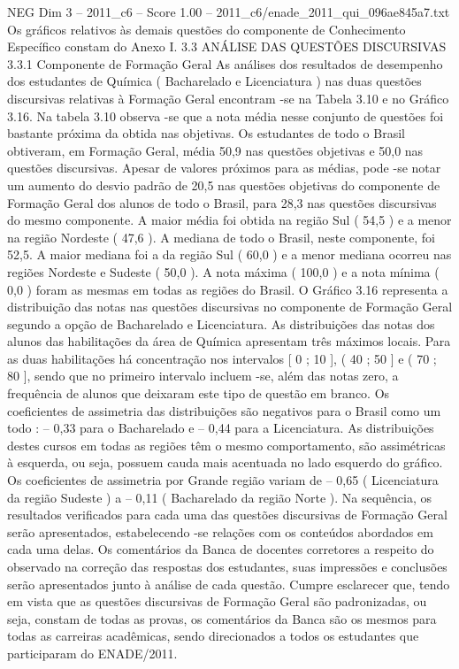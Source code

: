 \begin{textsample}{NEG Dim 3 – 2011\_c6 – Score 1.00 – 2011\_c6/enade\_2011\_qui\_096ae845a7.txt}
Os gráficos relativos às demais questões do componente de Conhecimento Específico constam do Anexo I. 3.3 ANÁLISE DAS QUESTÕES DISCURSIVAS 3.3.1 Componente de Formação Geral As análises dos resultados de desempenho dos estudantes de Química ( Bacharelado e Licenciatura ) nas duas questões discursivas relativas à Formação Geral encontram -se na Tabela 3.10 e no Gráfico 3.16.
Na tabela 3.10 observa -se que a nota média nesse conjunto de questões foi bastante próxima da obtida nas objetivas.
Os estudantes de todo o Brasil obtiveram, em Formação Geral, média 50,9 nas questões objetivas e 50,0 nas questões discursivas.
Apesar de valores próximos para as médias, pode -se notar um aumento do desvio padrão de 20,5 nas questões objetivas do componente de Formação Geral dos alunos de todo o Brasil, para 28,3 nas questões discursivas do mesmo componente.
A maior média foi obtida na região Sul ( 54,5 ) e a menor na região Nordeste ( 47,6 ).
A mediana de todo o Brasil, neste componente, foi 52,5.
A maior mediana foi a da região Sul ( 60,0 ) e a menor mediana ocorreu nas regiões Nordeste e Sudeste ( 50,0 ).
A nota máxima ( 100,0 ) e a nota mínima ( 0,0 ) foram as mesmas em todas as regiões do Brasil.
O Gráfico 3.16 representa a distribuição das notas nas questões discursivas no componente de Formação Geral segundo a opção de Bacharelado e Licenciatura.
As distribuições das notas dos alunos das habilitações da área de Química apresentam três máximos locais.
Para as duas habilitações há concentração nos intervalos [ 0 ; 10 ], ( 40 ; 50 ] e ( 70 ; 80 ], sendo que no primeiro intervalo incluem -se, além das notas zero, a frequência de alunos que deixaram este tipo de questão em branco.
Os coeficientes de assimetria das distribuições são negativos para o Brasil como um todo : – 0,33 para o Bacharelado e – 0,44 para a Licenciatura.
As distribuições destes cursos em todas as regiões têm o mesmo comportamento, são assimétricas à esquerda, ou seja, possuem cauda mais acentuada no lado esquerdo do gráfico.
Os coeficientes de assimetria por Grande região variam de – 0,65 ( Licenciatura da região Sudeste ) a – 0,11 ( Bacharelado da região Norte ).
Na sequência, os resultados verificados para cada uma das questões discursivas de Formação Geral serão apresentados, estabelecendo -se relações com os conteúdos abordados em cada uma delas.
Os comentários da Banca de docentes corretores a respeito do observado na correção das respostas dos estudantes, suas impressões e conclusões serão apresentados junto à análise de cada questão.
Cumpre esclarecer que, tendo em vista que as questões discursivas de Formação Geral são padronizadas, ou seja, constam de todas as provas, os comentários da Banca são os mesmos para todas as carreiras acadêmicas, sendo direcionados a todos os estudantes que participaram do ENADE/2011.

\end{textsample}
